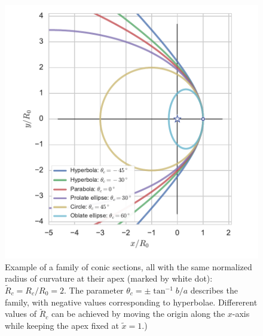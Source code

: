 \begin{figure}
\includegraphics[width=\linewidth]{conic1}
\caption{Example of a family of conic sections, all with the same
  normalized radius of curvature at their apex (marked by white dot):
  \(\widetilde{R}_c = R_c/R_0 = 2 \). The parameter
  $\theta_c = \pm \tan^{-1} b/a$ describes the family, with negative values
  corresponding to hyperbolae.  Differerent values of
  \(\widetilde{R}_c\) can be achieved by moving the origin along the
  \(x\)-axis while keeping the apex fixed at \(\tilde{x} = 1\).)}
\label{fig:conics-family}
\end{figure}


